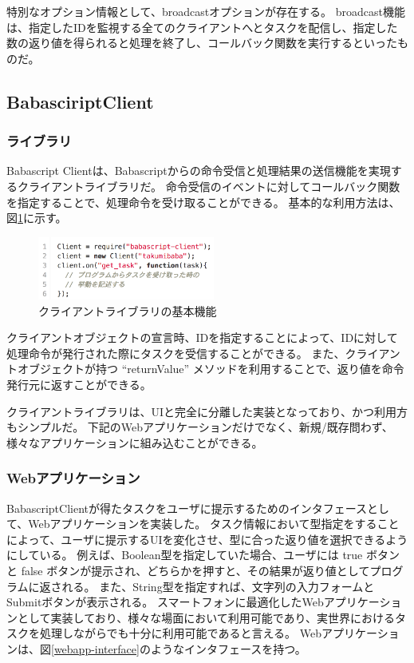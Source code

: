 特別なオプション情報として、broadcastオプションが存在する。
broadcast機能は、指定したIDを監視する全てのクライアントへとタスクを配信し、指定した数の返り値を得られると処理を終了し、コールバック関数を実行するといったものだ。

\subsection{BabasciriptClient}\label{babasciriptclient}

\subsubsection{ライブラリ}\label{ux30e9ux30a4ux30d6ux30e9ux30ea}

Babascript
Clientは、Babascriptからの命令受信と処理結果の送信機能を実現するクライアントライブラリだ。
命令受信のイベントに対してコールバック関数を指定することで、処理命令を受け取ることができる。
基本的な利用方法は、図\ref{client}に示す。

\begin{figure}[h]
  \centering
  \includegraphics[width=220px]{./images/client.png}
  \caption{クライアントライブラリの基本機能 }
  \label{client}
\end{figure}

クライアントオブジェクトの宣言時、IDを指定することによって、IDに対して処理命令が発行された際にタスクを受信することができる。
また、クライアントオブジェクトが持つ ``returnValue''
メソッドを利用することで、返り値を命令発行元に返すことができる。

クライアントライブラリは、UIと完全に分離した実装となっており、かつ利用方もシンプルだ。
下記のWebアプリケーションだけでなく、新規/既存問わず、様々なアプリケーションに組み込むことができる。

\subsubsection{Webアプリケーション}\label{webux30a2ux30d7ux30eaux30b1ux30fcux30b7ux30e7ux30f3}

BabascriptClientが得たタスクをユーザに提示するためのインタフェースとして、Webアプリケーションを実装した。
タスク情報において型指定をすることによって、ユーザに提示するUIを変化させ、型に合った返り値を選択できるようにしている。
例えば、Boolean型を指定していた場合、ユーザには true ボタンと false
ボタンが提示され、どちらかを押すと、その結果が返り値としてプログラムに返される。
また、String型を指定すれば、文字列の入力フォームとSubmitボタンが表示される。
スマートフォンに最適化したWebアプリケーションとして実装しており、様々な場面において利用可能であり、実世界におけるタスクを処理しながらでも十分に利用可能であると言える。
Webアプリケーションは、図\ref{webapp-interface}のようなインタフェースを持つ。

